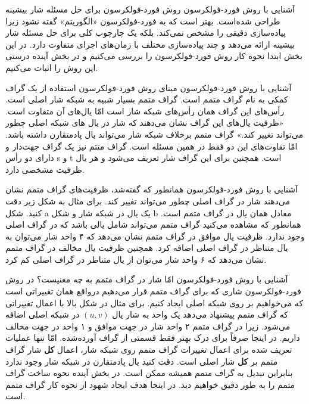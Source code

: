\begin{itemframe}{آشنایی با روش فورد-فولکرسون}
\itm
روش فورد-فولکرسون
برای حل مسئله شار بیشینه طراحی شده‌است. بهتر است که به فورد-فولکرسون «الگوریتم» گفته نشود زیرا پیاده‌سازی دقیقی را مشخص نمی‌کند. بلکه یک چارچوب کلی برای حل مسئله شار بیشینه ارائه می‌دهد و چند پیاده‌سازی مختلف با زمان‌های اجرای متفاوت دارد.
\itm
در این بخش ابتدا نحوه کار روش فورد-فولکرسون را بررسی می‌کنیم و در بخش آینده درستی این روش را اثبات می‌کنیم.
\end{itemframe}

\begin{itemframe}{آشنایی با روش فورد-فولکرسون}
\itm
مبنای روش فورد-فولکرسون استفاده از یک گراف کمکی به نام گراف متمم
 است. گراف متمم بسیار شبیه به شبکه شار اصلی است. رأس‌های این گراف همان رأس‌های شبکه شار است امّا یال‌های آن متفاوت است. «ظرفیت یال‌های این گراف نشان می‌دهند که شار در یال های شبکه اصلی چطور می‌تواند تغییر کند.»
\itm
گراف متمم برخلاف شبکه شار می‌تواند یال پادمتقارن داشته باشد. امّا تفاوت‌های این دو فقط در همین مسئله است. گراف متتم نیز یک گراف جهت‌دار و دارای دو رأس s و t است. همچنین برای این گراف شار تعریف می‌شود و هر یال ظرفیت مشخصی دارد.
\end{itemframe}
\begin{itemframe}{آشنایی با روش فورد-فولکرسون}
\itm
همانطور که گفته‌شد، ظرفیت‌های گراف متمم نشان می‌دهند شار در گراف اصلی چطور می‌تواند تغییر کند. برای مثال به شکل زیر دقت کنید. شکل a یک یال در شبکه شار و شکل b معادل همان یال در گراف متمم است.
\itm
همانطور که مشاهده می‌کنید گراف متمم می‌تواند شامل یالی باشد که در گراف اصلی وجود ندارد.
\itm
ظرفیت یال موافق در گراف متمم نشان می‌دهد که ۴ واحد شار می‌توان به یال متناظر در گراف اصلی اضافه کرد. همچنین ظرفیت یال مخالف در گراف متمم نشان می‌دهد که ۶ واحد شار می‌توان از یال متناظر در گراف اصلی کم کرد.
\end{itemframe}

\begin{itemframe}{آشنایی با روش فورد-فولکرسون}
\itm
امّا شار در گراف متمم به چه معنیست؟ در روش فورد-فولکرسون شاری که برای گراف متمم قرار می‌دهیم درواقع همان تغییراتی است که می‌خواهیم بر روی شبکه اصلی ایجاد کنیم.
\itm
 برای مثال در شکل بالا با اعمال تغییراتی که گراف متمم پیشنهاد می‌دهد یک واحد به شار یال
$(u, v)$
 در شبکه اصلی اضافه می‌شود. زیرا در گراف متمم ۲ واحد شار در جهت موافق و ۱ واحد در جهت مخالف داریم.
\itm
در اینجا صرفاً برای درک بهتر فقط قسمتی از گراف آورده‌شده. امّا تنها عملیات تعریف شده برای اعمال تغییرات گراف متمم روی شبکه شار، اعمال \textbf{کل} شار گراف متمم بر \textbf{کل} شار اصلی است.
\itm
دقت کنید یال پادمتقارن در شبکه شار وجود ندارد بنابراین تبدیل به گراف متمم همیشه ممکن است. در بخش آینده نحوه ساخت گراف متمم را به طور دقیق خواهیم دید. در اینجا هدف ایجاد شهود از نحوه کار گراف متمم است.
\end{itemframe}

